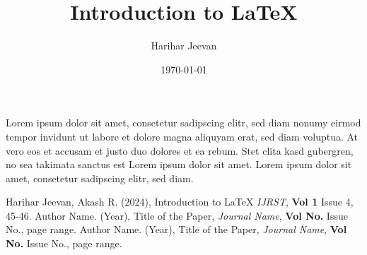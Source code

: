\documentclass{article}
\begin{document}
	\title{Introduction to LaTeX}
	\author{Harihar Jeevan}
	\date{\today}
	\maketitle
	
	Lorem ipsum dolor sit amet,\cite{citation1} consetetur sadipscing elitr, sed diam nonumy eirmod tempor invidunt ut labore et dolore magna aliquyam erat, sed diam voluptua.\cite{citation2} At vero eos et accusam et justo duo dolores et ea rebum. Stet clita kasd gubergren, no sea takimata sanctus est Lorem ipsum dolor sit amet. Lorem ipsum dolor sit amet, consetetur sadipscing elitr, sed diam.\cite{citation3}
	
	\begin{thebibliography}{99}
		 Harihar Jeevan, Akash R. (2024), Introduction to LaTeX \emph{IJRST}, \textbf{Vol 1} {Issue 4}, 45-46.
		 Author Name. (Year), Title of the Paper, \emph{Journal Name}, \textbf{Vol No.} {Issue No.}, page range.
		 Author Name. (Year), Title of the Paper, \emph{Journal Name}, \textbf{Vol No.} {Issue No.}, page range.
	\end{thebibliography}
\end{document}
